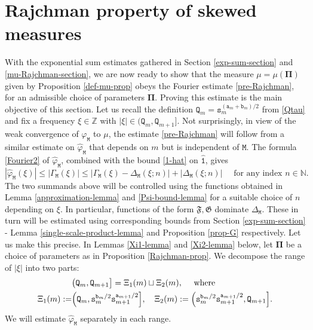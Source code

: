 \documentclass[12pt, twoside]{article}
\theoremstyle{definition}
\numberwithin{equation}{section}
\begin{document}
\section{Rajchman property of skewed measures} \label{Rajchman-section} 
With the exponential sum estimates gathered in Section \ref{exp-sum-section} and \ref{mu-Rajchman-section}, we are now ready to show that the measure $\mu = \mu(\pmb{\Pi})$ given by Proposition \ref{def-mu-prop} obeys the Fourier estimate \eqref{pre-Rajchman}, for an admissible choice of parameters $\pmb{\Pi}$. Proving this estimate is the main objective of this section.
\vskip0.1in 
\noindent Let us recall the definition $\mathtt Q_m = \mathtt s_m^{(\mathtt a_m + \mathtt b_m)/2}$ from \eqref{Qtau} and fix a frequency $\xi \in \mathbb Z$ with $|\xi| \in (\mathtt Q_m, \mathtt Q_{m+1}]$. Not surprisingly, in view of the weak convergence of $\varphi_{\mathtt M}$ to $\mu$, the estimate \eqref{pre-Rajchman} will follow from a similar estimate on $\widehat{\varphi}_{\mathtt M}$ that depends on $m$ but is independent of $\mathtt M$. The formula \eqref{Fourier2} of $\widehat{\varphi}_{\mathtt M}$, combined with the bound \eqref{1-hat} on $\widehat{\mathtt 1}$, gives 
 \begin{equation} \label{phiM-hat-bound} 
 |\widehat{\varphi}_{\mathtt M}(\xi)| \leq |\Gamma_{\mathtt M}(\xi)| \leq   \bigl|\Gamma_{\mathtt M}(\xi) - \Delta_{\mathtt M}(\xi; n)\bigr| + \bigl|\Delta_{\mathtt M}(\xi;n) \bigr| \quad \text{ for any index } n \in \mathbb N. 
 \end{equation} 
 The two summands above will be controlled using the functions obtained in Lemma \ref{approximation-lemma} and \ref{Psi-bound-lemma} for a suitable choice of $n$ depending on $\xi$. In particular, functions of the form $\mathfrak F, \mathfrak G$ dominate $\Delta_{\mathtt M}$. These in turn will be estimated using corresponding bounds from Section \ref{exp-sum-section} -  Lemma \ref{single-scale-product-lemma} and Proposition \ref{prop-G} respectively.
 \vskip0.1in 
 \noindent Let us make this precise. In Lemmas \ref{Xi1-lemma} and \ref{Xi2-lemma} below, let $\pmb{\Pi}$ be a choice of parameters as in Proposition \ref{Rajchman-prop}. We decompose the range of $|\xi|$ into two parts: 
\begin{align}
&\bigl(\mathtt Q_{m}, \mathtt Q_{m+1} \bigr] = \Xi_1(m) \sqcup \Xi_2(m), \quad\text{ where } \nonumber \\ \Xi_1(m) := &\Bigl(\mathtt Q_{m}, \mathtt s_{m}^{{\mathtt b_{m}}/{2}} \mathtt s_{m+1}^{{\mathtt a_{m+1}}/{2}} \Bigr], \quad \Xi_2(m) := \Bigl(\mathtt s_{m}^{{\mathtt b_{m}}/{2}} \mathtt s_{m+1}^{{\mathtt a_{m+1}}/{2}}, \mathtt Q_{m+1} \Bigr].  \label{Xi-12}
\end{align}
We will estimate $\widehat{\varphi}_{\mathtt M}$ separately in each range. 
\end{document}
